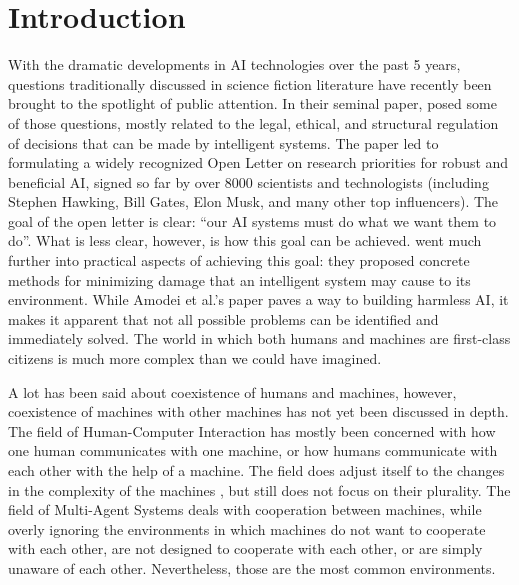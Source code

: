 \documentclass[ijoc,nonblindrev]{informs3} %
\numberwithin{equation}{subsection}
\begin{document}
\newpage
\section {Introduction}

With the dramatic developments in AI technologies over the past 5 years, questions traditionally discussed in science fiction literature have recently been brought to the spotlight of public attention. In their seminal paper, \cite{russell2016research} posed some of those questions, mostly related to the legal, ethical, and structural regulation of decisions that can be made by intelligent systems. The paper led to formulating a widely recognized Open Letter on research priorities for robust and beneficial AI, signed so far by over 8000 scientists and technologists (including Stephen Hawking, Bill Gates, Elon Musk, and many other top influencers). The goal of the open letter is clear: ``our AI systems must do what we want them to do''. What is less clear, however, is how this goal can be achieved. \cite{amodei2016concrete} went much further into practical aspects of achieving this goal: they proposed concrete methods for minimizing damage that an intelligent system may cause to its environment. While Amodei et al.'s paper paves a way to building harmless AI, it makes it apparent that not all possible problems can be identified and immediately solved. The world in which both humans and machines are first-class citizens is much more complex than we could have imagined.

A lot has been said about coexistence of humans and machines, however, coexistence of machines with other machines has not yet been discussed in depth. The field of Human-Computer Interaction \citep{dix2009human} has mostly been concerned with how one human communicates with one machine, or how humans communicate with each other with the help of a machine. The field does adjust itself to the changes in the complexity of the machines \citep{sellen2009reflecting}, but still does not focus on their plurality. The field of Multi-Agent Systems \citep{olfati2007consensus} deals with cooperation between machines, while overly ignoring the environments in which machines do not want to cooperate with each other, are not designed to cooperate with each other, or are simply unaware of each other. Nevertheless, those are the most common environments.
\end{document}
